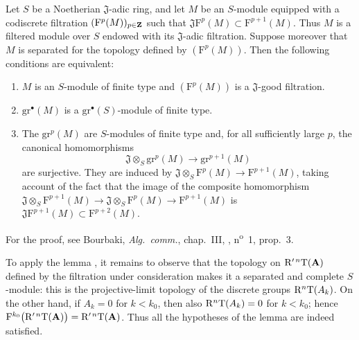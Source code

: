 \begin{lemma}[13.7.7.2]
\label{0.13.7.7.2}
Let $S$ be a Noetherian $\mathfrak{J}$-adic ring, and let $M$
be an $S$-module equipped with a codiscrete filtration
$(\mathrm{F}^p(M))_{p\in\mathbf{Z}}$ such that $\mathfrak{J}\mathrm{F}^p(M)
\subset
\mathrm{F}^{p+1}(M)$.
Thus $M$ is a filtered module over $S$ endowed with its
$\mathfrak{J}$-adic filtration.
Suppose moreover that $M$ is separated for the topology defined by
$(\mathrm{F}^p(M))$.
Then the following conditions are equivalent:
\begin{enumerate}
  \item[{\rm a)}] $M$ is an $S$-module of finite type and
  $(\mathrm{F}^p(M))$ is a $\mathfrak{J}$-good filtration.
  \item[{\rm b)}] $\mathrm{gr}^\bullet(M)$ is a
  $\mathrm{gr}^\bullet(S)$-module of finite type.
  \item[{\rm c)}] The $\mathrm{gr}^p(M)$ are $S$-modules of
  finite type and, for all sufficiently large $p$, the canonical
  homomorphisms
  \begin{equation}
  \label{0.13.7.7.3}
  \tag{13.7.7.3}
    \mathfrak{J}\otimes_S\mathrm{gr}^p(M)
    \longrightarrow
    \mathrm{gr}^{p+1}(M)
  \end{equation}
  are surjective.
  They are induced by
  $\mathfrak{J}\otimes_S\mathrm{F}^p(M)
  \longrightarrow\mathrm{F}^{p+1}(M)$, taking account of the fact
  that the image of the composite homomorphism $\mathfrak{J}\otimes_S\mathrm{F}^{p+1}(M)
\longrightarrow
\mathfrak{J}\otimes_S\mathrm{F}^p(M)
\longrightarrow
\mathrm{F}^{p+1}(M)$
  is
  $\mathfrak{J}\mathrm{F}^{p+1}(M)
  \subset\mathrm{F}^{p+2}(M)$.
\end{enumerate}
\end{lemma}

For the proof, see Bourbaki, \emph{Alg.\ comm.}, chap.~III,
, n\textsuperscript{o}~1, prop.~3.

\begin{env}[13.7.7.4]
\label{0.13.7.7.4}
To apply the lemma , it remains to observe that the
topology on $\mathrm{R}'^{\,n}\mathrm{T}(\mathbf{A})$ defined by the filtration
under consideration makes it a separated and complete $S$-module:
this is the projective-limit topology of the discrete groups
$\mathrm{R}^n\mathrm{T}(A_k)$.
On the other hand, if $A_k=0$ for $k<k_0$, then also
$\mathrm{R}^n\mathrm{T}(A_k)=0$ for $k<k_0$; hence $\mathrm{F}^{k_0}\bigl(\mathrm{R}'^{\,n}\mathrm{T}(\mathbf{A})\bigr)
=
\mathrm{R}'^{\,n}\mathrm{T}(\mathbf{A})$.
Thus all the hypotheses of the lemma are indeed satisfied.
\end{env}

